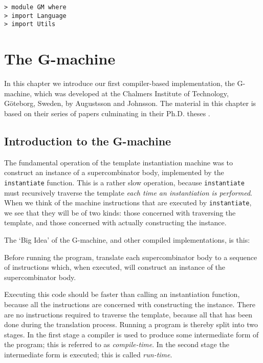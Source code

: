 \begin{verbatim}
> module GM where
> import Language
> import Utils
\end{verbatim}
%
%
%
\chapter{The G-machine}
\label{sect:g-machine}

In this chapter we introduce our first compiler-based implementation,
the G-machine, which was developed at the Chalmers
Institute of Technology, G\"oteborg, Sweden, by Augustsson and
Johnsson. The material in this chapter is based on their series of
papers \cite{Augustsson:LFP84,Johnsson:CC84} culminating in their Ph.D.
theses \cite{Augustsson:thesis87,Johnsson:thesis87}.

\section{Introduction to the G-machine}

The fundamental operation of the template instantiation machine was to
construct an instance of a supercombinator body, implemented by the
\mbox{\tt instantiate} function. This is a rather slow operation, because
\mbox{\tt instantiate} must recursively traverse the template {\em each time an
instantiation is performed}. When we think of the machine instructions
that are executed by \mbox{\tt instantiate}, we see that they will be of two
kinds: those concerned with traversing the template, and those
concerned with actually constructing the instance.

The `Big Idea' of the G-machine, and other
compiled implementations, is this:
\begin{important}
Before running the program, translate each supercombinator body to a
sequence of instructions which, when executed, will construct an
instance of the supercombinator body.
\end{important}

Executing this code should be faster than calling an instantiation
function, because all the instructions are concerned with constructing
the instance.  There are no instructions required to traverse the
template, because all that has been done during the translation
process. Running a program is thereby split into two stages. In the
first stage a compiler is used to produce some intermediate form of the
program; this is referred to as {\em compile-time}.
 In the second stage the intermediate form is executed; this is called
{\em run-time}.

